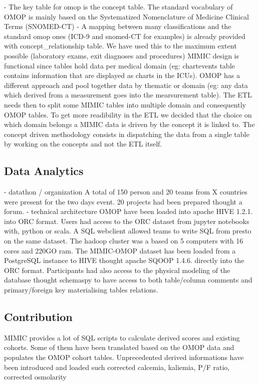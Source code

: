 - The key table for omop is the concept table. The standard vocabulary of OMOP
is mainly based on the Systematized Nomenclature of Medicine Clinical Terms
(SNOMED-CT)
- A mapping between many classifications and the standard omop ones (ICD-9 and
snomed-CT for examples) is already provided with concept_relationship table. We
have used this to the maximum extent possible (laboratory exams, exit diagnoses
and procedures)
MIMIC design is functional since tables hold data per medical domain (eg:
chartevents table contains information that are displayed as charts in the
ICUs). OMOP has a different approach and pool together data by thematic or
domain (eg: any data which derived from a measurement goes into the
mearsurement table). The ETL needs then to split some MIMIC tables into
multiple domain and consequently OMOP tables. To get more readibility in the
ETL we decided that the choice on which domain belongs a MIMIC data is driven
by the concept it is linked to. The concept driven methodology consists in
dispatching the data from a single table by working on the concepts and not the
ETL itself.

\subsection{Data Analytics}
- datathon / organization
A total of 150 person and 20 teams from X countries were present for the two
days event. 20 projects had been prepared thought a forum.
- technical architecture
OMOP have been loaded into apache HIVE 1.2.1. into ORC format. Users had access
to the ORC dataset from jupyter notebooks with, python or scala. A SQL
webclient allowed teams to write SQL from presto on the same dataset. The
hadoop cluster was a based on 5 computers with 16 cores and 220GO ram.
The MIMIC-OMOP dataset has been loaded from a PostgreSQL instance to HIVE
thought apache SQOOP 1.4.6. directly into the ORC format. 
Participants had also access to the physical modeling of the database thought
schemaspy to have access to both table/column comments and primary/foreign key
materialising tables relations.
\subsection{Contribution}
MIMIC provides a lot of SQL scripts to calculate derived scores and existing
cohorts. Some of them have been translated based on the OMOP data and
populates the OMOP cohort tables.
Unprecedented derived informations have been introduced and loaded such
corrected calcemia, kaliemia, P/F ratio, corrected osmolarity

